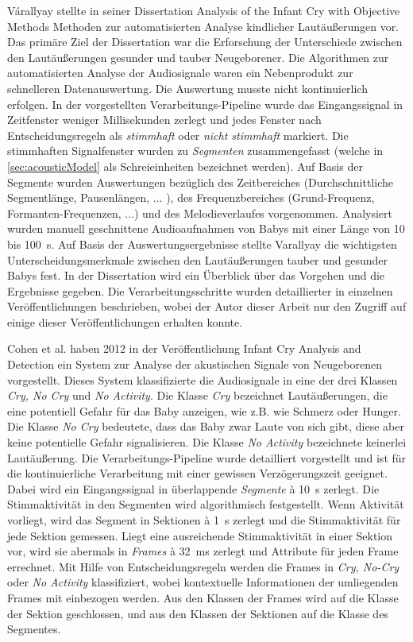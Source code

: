 Várallyay stellte in seiner Dissertation \glqq Analysis of the Infant Cry with Objective Methods\grqq{} \cite{cry_thesis} Methoden zur automatisierten Analyse kindlicher Lautäußerungen vor. Das primäre Ziel der Dissertation war die Erforschung der Unterschiede zwischen den Lautäußerungen gesunder und tauber Neugeborener. Die Algorithmen zur automatisierten Analyse der Audiosignale waren ein \glqq Nebenprodukt\grqq{} zur schnelleren Datenauswertung. Die Auswertung musste nicht kontinuierlich erfolgen. In der vorgestellten Verarbeitungs-Pipeline wurde das Eingangssignal in Zeitfenster weniger Millisekunden zerlegt und jedes Fenster nach Entscheidungsregeln als \emph{stimmhaft} oder \emph{nicht stimmhaft} markiert. Die stimmhaften Signalfenster wurden zu \emph{Segmenten} zusammengefasst (welche in \autoref{sec:acousticModel} als Schreieinheiten bezeichnet werden). Auf Basis der Segmente wurden Auswertungen bezüglich des Zeitbereiches (Durchschnittliche Segmentlänge, Pausenlängen, ... ), des Frequenzbereiches (Grund-Frequenz, Formanten-Frequenzen, ...) und des Melodieverlaufes vorgenommen. Analysiert wurden manuell geschnittene Audioaufnahmen von Babys mit einer Länge von 10 bis \SI{100}{\second}. Auf Basis der Auswertungsergebnisse stellte Varallyay die wichtigsten Unterscheidungsmerkmale zwischen den Lautäußerungen tauber und gesunder Babys fest. In der Dissertation \cite{cry_thesis} wird ein Überblick über das Vorgehen und die Ergebnisse gegeben. Die Verarbeitungsschritte wurden detaillierter in einzelnen Veröffentlichungen beschrieben, wobei der Autor dieser Arbeit nur den Zugriff auf einige dieser Veröffentlichungen erhalten konnte.

Cohen et al. haben 2012 in der Veröffentlichung \glqq Infant Cry Analysis and Detection\grqq{} \cite{cohenCry}  ein System zur Analyse der akustischen Signale von Neugeborenen vorgestellt. Dieses System klassifizierte die Audiosignale in eine der drei Klassen \emph{Cry, No Cry} und \emph{No Activity}. Die Klasse \emph{Cry} bezeichnet Lautäußerungen, die eine potentiell Gefahr für das Baby anzeigen, wie z.B. wie Schmerz oder Hunger. Die Klasse \emph{No Cry} bedeutete, dass das Baby zwar Laute von sich gibt, diese aber keine potentielle Gefahr signalisieren. Die Klasse \emph{No Activity} bezeichnete keinerlei Lautäußerung. Die Verarbeitungs-Pipeline wurde detailliert vorgestellt und ist für die kontinuierliche Verarbeitung mit einer gewissen Verzögerungszeit geeignet. Dabei wird ein Eingangssignal in überlappende \emph{Segmente} \`{a} \SI{10}{\second} zerlegt. Die Stimmaktivität in den Segmenten wird algorithmisch festgestellt. Wenn Aktivität vorliegt, wird das Segment in Sektionen \`{a} \SI{1}{\second} zerlegt und die Stimmaktivität für jede Sektion gemessen. Liegt eine ausreichende Stimmaktivität in einer Sektion vor, wird sie abermals in \emph{Frames} \`{a} \SI{32}{\milli\second} zerlegt und Attribute für jeden Frame errechnet. Mit Hilfe von Entscheidungsregeln werden die Frames in \emph{Cry, No-Cry} oder \emph{No Activity} klassifiziert, wobei kontextuelle Informationen der umliegenden Frames mit einbezogen werden. Aus den Klassen der Frames wird auf die Klasse der Sektion geschlossen, und aus den Klassen der Sektionen auf die Klasse des Segmentes. 

